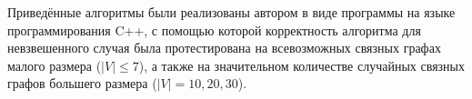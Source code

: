Приведённые алгоритмы были реализованы автором в виде программы на языке программирования C++, с помощью которой корректность алгоритма для невзвешенного случая была протестирована на всевозможных связных графах малого размера ($|V| \leq 7$), а также на значительном количестве случайных связных графов большего размера ($|V| = 10, 20, 30$). 
